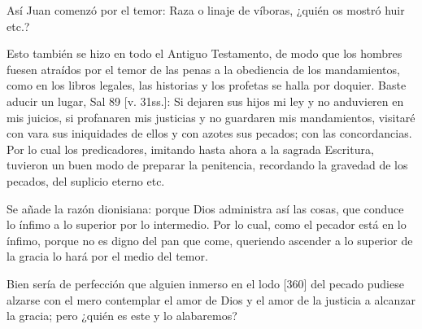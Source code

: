 Así Juan comenzó por el temor: Raza o linaje de víboras, ¿quién os mostró huir etc.?

Esto también se hizo en todo el Antiguo Testamento, de modo que los hombres fuesen atraídos por el temor de las penas a la obediencia de los mandamientos, como en los libros legales, las historias y los profetas se halla por doquier. Baste aducir un lugar, Sal 89 [v. 31ss.]: Si dejaren sus hijos mi ley y no anduvieren en mis juicios, si profanaren mis justicias y no guardaren mis mandamientos, visitaré con vara sus iniquidades de ellos y con azotes sus pecados; con las concordancias. Por lo cual los predicadores, imitando hasta ahora a la sagrada Escritura, tuvieron un buen modo de preparar la penitencia, recordando la gravedad de los pecados, del suplicio eterno etc.

Se añade la razón dionisiana: porque Dios administra así las cosas, que conduce lo ínfimo a lo superior por lo intermedio. Por lo cual, como el pecador está en lo ínfimo, porque no es digno del pan que come, queriendo ascender a lo superior de la gracia lo hará por el medio del temor.

Bien sería de perfección que alguien inmerso en el lodo [360] del pecado pudiese alzarse con el mero contemplar el amor de Dios y el amor de la justicia a alcanzar la gracia; pero ¿quién es este y lo alabaremos?

